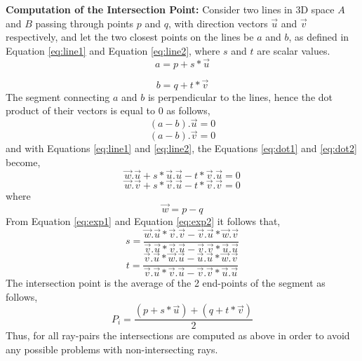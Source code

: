 \documentclass[final,12pt,3p]{elsarticle}
\begin{document}
\textbf{Computation of the Intersection Point:} Consider two lines in 3D space $A$ and $B$ passing through points $p$ and $q$, with direction vectors $\vec{u}$ and $\vec{v}$ respectively, and let the two closest points on the lines be $a$ and $b$, as defined in Equation \ref{eq:line1} and Equation \ref{eq:line2}, where $s$ and $t$ are scalar values.
\begin{equation}
	a = p + s*\vec{u}
	\label{eq:line1}
\end{equation} 

\begin{equation}
	b = q + t*\vec{v}
	\label{eq:line2}
\end{equation}
The segment connecting $a$ and $b$ is perpendicular to the lines, hence the dot product of their vectors is equal to $0$ as follows,  
\begin{equation}
	(a-b).\vec{u}=0
	\label{eq:dot1}
\end{equation} 
\begin{equation}
	(a-b).\vec{v}=0
	\label{eq:dot2}
\end{equation}
and with Equations \ref{eq:line1} and \ref{eq:line2}, the Equations \ref{eq:dot1} and \ref{eq:dot2} become,
\begin{equation}
	\vec{w}.\vec{u} + s*\vec{u}.\vec{u} - t*\vec{v}.\vec{u} = 0
	\label{eq:exp1}
\end{equation} 
\begin{equation}
	\vec{w}.\vec{v} + s*\vec{v}.\vec{u} - t*\vec{v}.\vec{v} = 0
	\label{eq:exp2}
\end{equation} 
where
\begin{equation}
	\vec{w} = p - q
	\label{eq:w}
\end{equation} 
From Equation \ref{eq:exp1} and Equation \ref{eq:exp2} it follows that, 
\begin{equation}
	s = \frac{\vec{w}.\vec{u}*\vec{v}.\vec{v} - \vec{v}.\vec{u}*\vec{w}.\vec{v}}{\vec{v}.\vec{u}*\vec{v}.\vec{u} - \vec{v}.\vec{v}*\vec{u}.\vec{u}} 
	\label{eq:seq}
\end{equation}
\begin{equation}
	t = \frac{\vec{v}.\vec{u}*\vec{w}.\vec{u} - \vec{u}.\vec{u}*\vec{w}.\vec{v}}{\vec{v}.\vec{u}*\vec{v}.\vec{u} - \vec{v}.\vec{v}*\vec{u}.\vec{u}} 
	\label{eq:teq}
\end{equation}
The intersection point is the average of the 2 end-points of the segment as follows,
\begin{equation}
	P_i = \frac{(p + s*\vec{u}) + (q + t*\vec{v})}{2} 
	\label{eq:final}
\end{equation}
Thus, for all ray-pairs the intersections are computed as above in order to avoid any possible problems with non-intersecting rays. 
\end{document}

